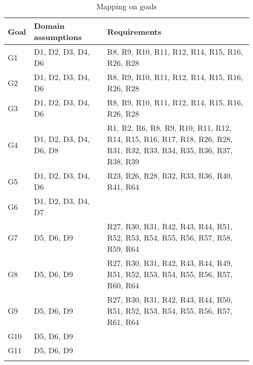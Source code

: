 \begin{center}
    \begin{longtable}[H]{|p{0.1\linewidth}|p{0.3\linewidth}|p{0.6\linewidth}|}
     \hline
     \textbf{Goal} & \textbf{Domain assumptions} & \textbf{Requirements}\\
     \hline
     G1 & D1, D2, D3, D4, D6 
        & R8, R9, R10, R11, R12, R14, R15, R16, R26, R28\\
     \hline
     G2 & D1, D2, D3, D4, D6  
        & R8, R9, R10, R11, R12, R14, R15, R16, R26, R28\\
     \hline
     G3 & D1, D2, D3, D4, D6 
        & R8, R9, R10, R11, R12, R14, R15, R16, R26, R28\\
     \hline
     G4 & D1, D2, D3, D4, D6, D8 
        & R1, R2, R6, R8, R9, R10, R11, R12, R14, R15, R16, R17, R18, R26, R28, R31, R32, R33, R34, R35, R36, R37, R38, R39 \\
     \hline
     G5 & D1, D2, D3, D4, D6 
        & R23, R26, R28, R32, R33, R36, R40, R41, R64\\
     \hline
     G6 & D1, D2, D3, D4, D7 
        & \\
     \hline
     G7 & D5, D6, D9
        & R27, R30, R31, R42, R43, R44, R51, R52, R53, R54, R55, R56, R57, R58, R59, R64\\
     \hline
     G8 & D5, D6, D9
        & R27, R30, R31, R42, R43, R44, R49, R51, R52, R53, R54, R55, R56, R57, R60, R64\\
     \hline
     G9 & D5, D6, D9
        & R27, R30, R31, R42, R43, R44, R50, R51, R52, R53, R54, R55, R56, R57, R61, R64\\
     \hline
     G10 & D5, D6, D9
        & \\
     \hline
     G11 & D5, D6, D9
        & \\
     \hline
    \caption{Mapping on goals}
    \label{tab:Mapping on goals}
    \end{longtable}
\end{center}

